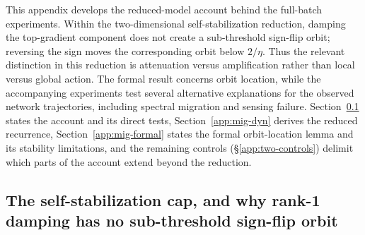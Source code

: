
This appendix develops the reduced-model account behind the full-batch
experiments. Within the two-dimensional self-stabilization reduction, damping
the top-gradient component does not create a sub-threshold sign-flip orbit;
reversing the sign moves the corresponding orbit below $2/\eta$. Thus the
relevant distinction in this reduction is attenuation versus amplification
rather than local versus global action. The formal result concerns orbit
location, while the accompanying experiments test several alternative
explanations for the observed network trajectories, including spectral
migration and sensing failure. Section~\ref{app:mig-struct} states the
account and its direct tests, Section~\ref{app:mig-dyn} derives the reduced
recurrence, Section~\ref{app:mig-formal} states the formal orbit-location
lemma and its stability limitations, and the remaining controls
(\S\ref{app:two-controls}) delimit which parts of the account extend beyond
the reduction.

\subsection{The self-stabilization cap, and why rank-1 damping has no sub-threshold sign-flip orbit}
\label{app:mig-struct}

